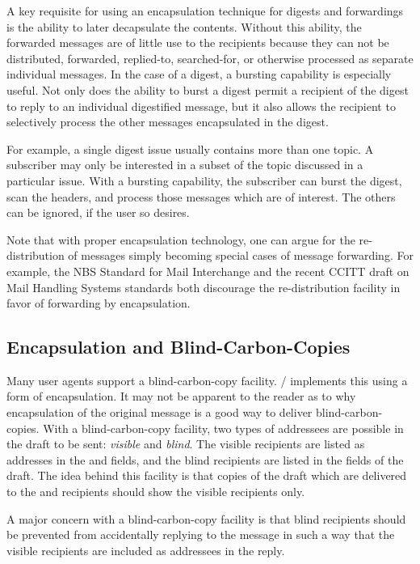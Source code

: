 A key requisite for using an encapsulation technique for digests and
forwardings is the ability to later decapsulate the contents.
Without this ability,
the forwarded messages are of little use to the recipients because they can
not be distributed, forwarded, replied-to, searched-for,
or otherwise processed as separate individual messages.
In the case of a digest,
a bursting capability is especially useful.
Not only does the ability to burst a digest permit a recipient of the digest
to reply to an individual digestified message,
but it also allows the recipient to selectively process the other messages
encapsulated in the digest.

For example,
a single digest issue usually contains more than one topic.
A subscriber may only be interested in a subset of the topic discussed in a
particular issue.
With a bursting capability,
the subscriber can burst the digest,
scan the headers,
and process those messages which are of interest.
The others can be ignored,
if the user so desires.

Note that with proper encapsulation technology,
one can argue for the re-distribution of messages simply becoming
special cases of message forwarding.
For example,
the NBS Standard for Mail Interchange\cite{FIPS98}
and the recent CCITT draft on Mail Handling Systems standards\cite{X.400}
both discourage the re-distribution facility in favor of forwarding
by encapsulation.

\subsection{Encapsulation and Blind-Carbon-Copies} %
Many user agents support a blind-carbon-copy facility.
\MH/ implements this using a form of encapsulation.
It may not be apparent to the reader as to why encapsulation of the original
message is a good way to deliver blind-carbon-copies.
With a blind-carbon-copy facility,
two types of addressees are possible in the draft to be sent:
{\it visible} and {\it blind}.
The visible recipients are listed as addresses in the  and 
fields,
and the blind recipients are listed in the  fields of the draft.
The idea behind this facility is that copies of the draft which are
delivered to the  and  recipients should show the visible
recipients only.

A major concern with a blind-carbon-copy facility
is that blind recipients should be prevented from accidentally replying to the
message in such a way that the visible recipients are included as addressees
in the reply.

